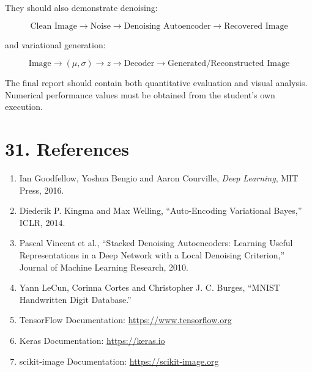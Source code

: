 \documentclass[10pt]{article}
\begin{document}
They should also demonstrate denoising:

\[
\boxed{
\text{Clean Image}
\rightarrow
\text{Noise}
\rightarrow
\text{Denoising Autoencoder}
\rightarrow
\text{Recovered Image}
}
\]

and variational generation:

\[
\boxed{
\text{Image}
\rightarrow
(\mu,\sigma)
\rightarrow
z
\rightarrow
\text{Decoder}
\rightarrow
\text{Generated/Reconstructed Image}
}
\]

The final report should contain both quantitative evaluation and visual
analysis. Numerical performance values must be obtained from the student's
own execution.

\section*{31. References}

\begin{enumerate}
\item Ian Goodfellow, Yoshua Bengio and Aaron Courville,
\emph{Deep Learning}, MIT Press, 2016.

\item Diederik P. Kingma and Max Welling,
``Auto-Encoding Variational Bayes,'' ICLR, 2014.

\item Pascal Vincent et al.,
``Stacked Denoising Autoencoders: Learning Useful Representations in a Deep
Network with a Local Denoising Criterion,'' Journal of Machine Learning
Research, 2010.

\item Yann LeCun, Corinna Cortes and Christopher J. C. Burges,
``MNIST Handwritten Digit Database.''

\item TensorFlow Documentation:
\url{https://www.tensorflow.org}

\item Keras Documentation:
\url{https://keras.io}

\item scikit-image Documentation:
\url{https://scikit-image.org}
\end{enumerate}
\end{document}
